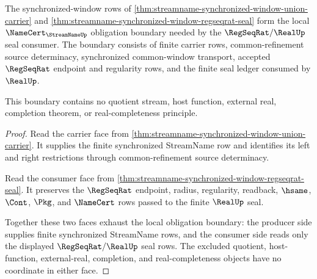 \begin{theorem}
\label{thm:streamname-synchronized-window-namecert-boundary}
The synchronized-window rows of
\autoref{thm:streamname-synchronized-window-union-carrier} and
\autoref{thm:streamname-synchronized-window-regseqrat-seal} form the local
$\NameCert_{\StreamNameUp}$ obligation boundary needed by the
$\RegSeqRat/\RealUp$ seal consumer. The boundary consists of finite carrier
rows, common-refinement source determinacy, synchronized common-window
transport, accepted $\RegSeqRat$ endpoint and regularity rows, and the finite
seal ledger consumed by $\RealUp$.

This boundary contains no quotient stream, host function, external real,
completion theorem, or real-completeness principle.
\end{theorem}
\begin{proof}
Read the carrier face from
\autoref{thm:streamname-synchronized-window-union-carrier}. It supplies the
finite synchronized StreamName row and identifies its left and right
restrictions through common-refinement source determinacy.

Read the consumer face from
\autoref{thm:streamname-synchronized-window-regseqrat-seal}. It preserves the
$\RegSeqRat$ endpoint, radius, regularity, readback, $\hsame$, $\Cont$,
$\Pkg$, and $\NameCert$ rows passed to the finite $\RealUp$ seal.

Together these two faces exhaust the local obligation boundary: the producer
side supplies finite synchronized StreamName rows, and the consumer side reads
only the displayed $\RegSeqRat/\RealUp$ seal rows. The excluded quotient,
host-function, external-real, completion, and real-completeness objects have
no coordinate in either face.
\end{proof}

